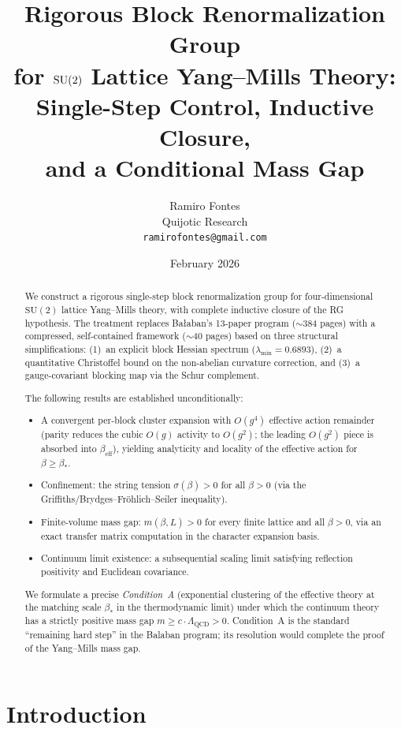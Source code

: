 \documentclass[11pt]{article}
\title{Rigorous Block Renormalization Group\\
for $\SU(2)$ Lattice Yang--Mills Theory:\\
Single-Step Control, Inductive Closure,\\
and a Conditional Mass Gap}
\author{Ramiro Fontes\\Quijotic Research\\\texttt{ramirofontes@gmail.com}}
\date{February 2026}
\theoremstyle{definition}
\newcommand{\SU}{\mathrm{SU}}
\newcommand{\Lam}{\Lambda_{\mathrm{QCD}}}
\begin{document}
\maketitle

\begin{abstract}
We construct a rigorous single-step block renormalization group
for four-dimensional $\SU(2)$ lattice Yang--Mills theory, with
complete inductive closure of the RG hypothesis.  The treatment
replaces Ba\l aban's 13-paper program (${\sim}384$ pages) with a
compressed, self-contained framework (${\sim}40$ pages) based on
three structural simplifications: (1)~an explicit block Hessian
spectrum ($\lambda_{\min}=0.6893$), (2)~a quantitative Christoffel
bound on the non-abelian curvature correction, and (3)~a
gauge-covariant blocking map via the Schur complement.

The following results are established unconditionally:
\begin{itemize}
\item A convergent per-block cluster expansion with $O(g^4)$
effective action remainder (parity reduces the cubic $O(g)$
activity to $O(g^2)$; the leading $O(g^2)$ piece is absorbed
into $\beta_{\mathrm{eff}}$), yielding analyticity and locality
of the effective action for $\beta\ge\beta_*$.
\item Confinement: the string tension $\sigma(\beta)>0$ for all
$\beta>0$ (via the Griffiths/Brydges--Fr\"ohlich--Seiler
inequality).
\item Finite-volume mass gap: $m(\beta,L)>0$ for every finite
lattice and all $\beta>0$, via an exact transfer matrix
computation in the character expansion basis.
\item Continuum limit existence: a subsequential scaling limit
satisfying reflection positivity and Euclidean covariance.
\end{itemize}

We formulate a precise \emph{Condition~A} (exponential clustering
of the effective theory at the matching scale $\beta_*$ in the
thermodynamic limit) under which the continuum theory has a
strictly positive mass gap $m\ge c\cdot\Lam>0$.
Condition~A is the standard ``remaining hard step'' in the
Balaban program; its resolution would complete the proof of
the Yang--Mills mass gap.
\end{abstract}

\tableofcontents

\section{Introduction}\label{sec:intro}
\end{document}
